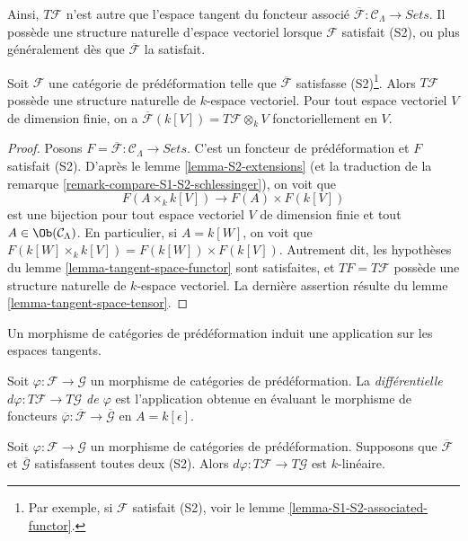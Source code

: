 \noindent
Ainsi, $T \mathcal{F}$ n'est autre que l'espace tangent du foncteur associé
$\overline{\mathcal{F}}: \mathcal{C}_\Lambda \to \textit{Sets}$. Il possède
une structure naturelle d'espace vectoriel lorsque $\mathcal{F}$ satisfait
(S2), ou plus généralement dès que $\overline{\mathcal{F}}$ la satisfait.

\begin{lemma}
\label{lemma-tangent-space-vector-space}
Soit $\mathcal{F}$ une catégorie de prédéformation telle que
$\overline{\mathcal{F}}$ satisfasse (S2)\footnote{Par exemple, si
$\mathcal{F}$ satisfait (S2), voir le lemme
\ref{lemma-S1-S2-associated-functor}.}. Alors $T \mathcal{F}$ possède une
structure naturelle de $k$-espace vectoriel. Pour tout espace vectoriel $V$
de dimension finie, on a
$\overline{\mathcal{F}}(k[V]) = T\mathcal{F} \otimes_k V$
fonctoriellement en $V$.
\end{lemma}

\begin{proof}
Posons
$F = \overline{\mathcal{F}} : \mathcal{C}_\Lambda \to \textit{Sets}$.
C'est un foncteur de prédéformation et $F$ satisfait (S2). D'après le lemme
\ref{lemma-S2-extensions} (et la traduction de la remarque
\ref{remark-compare-S1-S2-schlessinger}), on voit que
$$
F(A \times_k k[V]) \longrightarrow F(A) \times F(k[V])
$$
est une bijection pour tout espace vectoriel $V$ de dimension finie et tout
$A \in \Ob(\mathcal{C}_\Lambda)$. En particulier, si $A = k[W]$, on voit que
$F(k[W] \times_k k[V]) = F(k[W]) \times F(k[V])$. Autrement dit, les
hypothèses du lemme \ref{lemma-tangent-space-functor} sont satisfaites, et
$TF = T \mathcal{F}$ possède une structure naturelle de $k$-espace
vectoriel. La dernière assertion résulte du lemme
\ref{lemma-tangent-space-tensor}.
\end{proof}

\noindent
Un morphisme de catégories de prédéformation induit une application sur les
espaces tangents.

\begin{definition}
\label{definition-differential}
Soit $\varphi : \mathcal{F} \to \mathcal{G}$ un morphisme de catégories de
prédéformation. La {\it différentielle
$d \varphi : T \mathcal{F} \to T \mathcal{G}$ de $\varphi$} est l'application
obtenue en évaluant le morphisme de foncteurs
$\overline{\varphi}: \overline{\mathcal{F}} \to \overline{\mathcal{G}}$ en
$A = k[\epsilon]$.
\end{definition}

\begin{lemma}
\label{lemma-k-linear-differential}
Soit $\varphi : \mathcal{F} \to \mathcal{G}$ un morphisme de catégories de
prédéformation. Supposons que $\overline{\mathcal{F}}$ et
$\overline{\mathcal{G}}$ satisfassent toutes deux (S2). Alors
$d \varphi : T \mathcal{F} \to T \mathcal{G}$ est $k$-linéaire.
\end{lemma}

